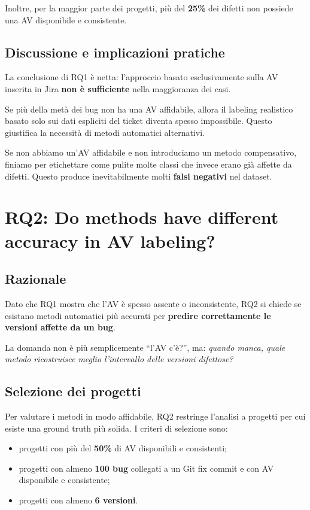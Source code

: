 Inoltre, per la maggior parte dei progetti, più del \textbf{25\%} dei difetti non possiede una AV disponibile e consistente.

\subsection{Discussione e implicazioni pratiche}

La conclusione di RQ1 è netta: l'approccio basato esclusivamente sulla AV inserita in Jira \textbf{non è sufficiente} nella maggioranza dei casi.

Se più della metà dei bug non ha una AV affidabile, allora il labeling realistico basato solo sui dati espliciti del ticket diventa spesso impossibile. Questo giustifica la necessità di metodi automatici alternativi.

\begin{notaprof}
Se non abbiamo un'AV affidabile e non introduciamo un metodo compensativo, finiamo per etichettare come pulite molte classi che invece erano già affette da difetti. Questo produce inevitabilmente molti \textbf{falsi negativi} nel dataset.
\end{notaprof}

\section{RQ2: Do methods have different accuracy in AV labeling?}

\subsection{Razionale}

Dato che RQ1 mostra che l'AV è spesso assente o inconsistente, RQ2 si chiede se esistano metodi automatici più accurati per \textbf{predire correttamente le versioni affette da un bug}.

La domanda non è più semplicemente ``l'AV c'è?'', ma: \emph{quando manca, quale metodo ricostruisce meglio l'intervallo delle versioni difettose?}

\subsection{Selezione dei progetti}

Per valutare i metodi in modo affidabile, RQ2 restringe l'analisi a progetti per cui esiste una ground truth più solida. I criteri di selezione sono:

\begin{itemize}
    \item progetti con più del \textbf{50\%} di AV disponibili e consistenti;
    \item progetti con almeno \textbf{100 bug} collegati a un Git fix commit e con AV disponibile e consistente;
    \item progetti con almeno \textbf{6 versioni}.
\end{itemize}

